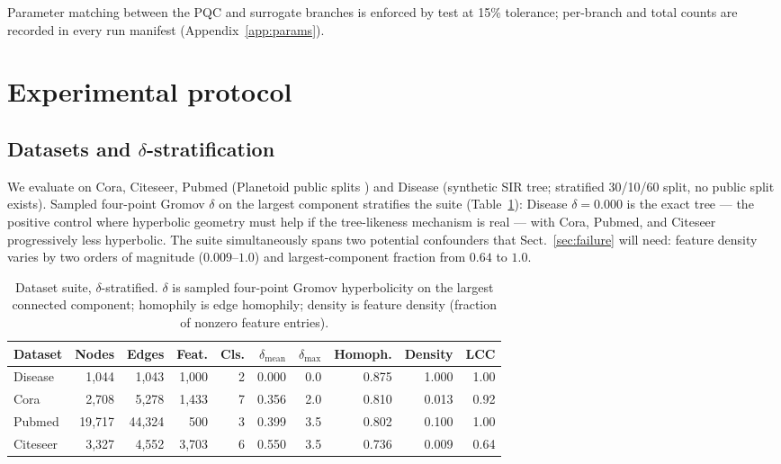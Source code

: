 \documentclass[pdflatex,sn-mathphys-num]{sn-jnl}
\begin{document}
Parameter matching between the PQC and surrogate branches is enforced by test at 15\% tolerance; per-branch and total counts are recorded in every run manifest (Appendix~\ref{app:params}).

\section{Experimental protocol}\label{sec:protocol}

\subsection{Datasets and \texorpdfstring{$\delta$}{delta}-stratification}\label{sec:datasets}

We evaluate on Cora, Citeseer, Pubmed (Planetoid public splits \cite{yang2016planetoid}) and Disease \cite{chami2019hgcn} (synthetic SIR tree; stratified 30/10/60 split, no public split exists). Sampled four-point Gromov $\delta$ on the largest component stratifies the suite (Table~\ref{tab:datasets}): Disease $\delta=0.000$ is the exact tree --- the positive control where hyperbolic geometry must help if the tree-likeness mechanism is real --- with Cora, Pubmed, and Citeseer progressively less hyperbolic. The suite simultaneously spans two potential confounders that Sect.~\ref{sec:failure} will need: feature density varies by two orders of magnitude ($0.009$--$1.0$) and largest-component fraction from $0.64$ to $1.0$.

\begin{table}[t]
\centering
\caption{Dataset suite, $\delta$-stratified. $\delta$ is sampled four-point Gromov hyperbolicity on the largest connected component; homophily is edge homophily; density is feature density (fraction of nonzero feature entries).}
\label{tab:datasets}
\footnotesize
\begin{tabular}{@{}lrrrrrrrrr@{}}
\toprule
Dataset & Nodes & Edges & Feat. & Cls. & $\delta_{\text{mean}}$ & $\delta_{\max}$ & Homoph. & Density & LCC \\
\midrule
Disease  & 1{,}044  & 1{,}043  & 1{,}000 & 2 & 0.000 & 0.0 & 0.875 & 1.000 & 1.00 \\
Cora     & 2{,}708  & 5{,}278  & 1{,}433 & 7 & 0.356 & 2.0 & 0.810 & 0.013 & 0.92 \\
Pubmed   & 19{,}717 & 44{,}324 & 500     & 3 & 0.399 & 3.5 & 0.802 & 0.100 & 1.00 \\
Citeseer & 3{,}327  & 4{,}552  & 3{,}703 & 6 & 0.550 & 3.5 & 0.736 & 0.009 & 0.64 \\
\bottomrule
\end{tabular}
\end{table}
\end{document}
